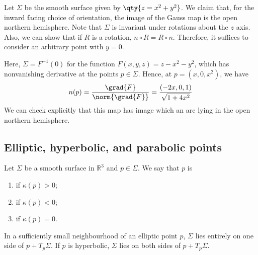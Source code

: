 \begin{example}
	Let $\Sigma$ be the smooth surface given by $\qty{z = x^2 + y^2}$.
	We claim that, for the inward facing choice of orientation, the image of the Gauss map is the open northern hemisphere.
	Note that $\Sigma$ is invariant under rotations about the $z$ axis.
	Also, we can show that if $R$ is a rotation, $n \circ R = R \circ n$.
	Therefore, it suffices to consider an arbitrary point with $y = 0$.

	Here, $\Sigma = F^{-1}(0)$ for the function $F(x,y,z) = z - x^2 - y^2$, which has nonvanishing derivative at the points $p \in \Sigma$.
	Hence, at $p = (x,0,x^2)$, we have
	\begin{align*}
		n(p) = \frac{\grad{F}}{\norm{\grad{F}}} = \frac{(-2x,0,1)}{\sqrt{1+4x^2}}
	\end{align*}
	We can check explicitly that this map has image which an arc lying in the open northern hemisphere.
\end{example}

\subsection{Elliptic, hyperbolic, and parabolic points}
\begin{definition}[Conics]
	Let $\Sigma$ be a smooth surface in $\mathbb R^3$ and $p \in \Sigma$.
	We say that $p$ is
	\begin{enumerate}
		\item {} if $\kappa(p) > 0$;
		\item {} if $\kappa(p) < 0$;
		\item {} if $\kappa(p) = 0$.
	\end{enumerate}
\end{definition}

\begin{lemma}
	In a sufficiently small neighbourhood of an elliptic point $p$, $\Sigma$ lies entirely on one side of $p + T_p \Sigma$.
	If $p$ is hyperbolic, $\Sigma$ lies on both sides of $p + T_p \Sigma$.
\end{lemma}

